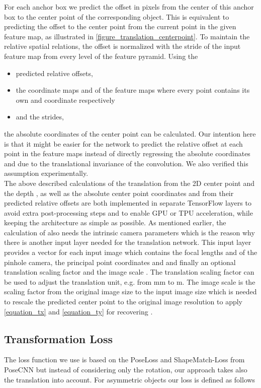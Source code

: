 \documentclass[twocolumn, 10pt, letterpaper]{article}
\begin{document}
For each anchor box we predict the offset in pixels from the center of this anchor box to the center point  of the corresponding object. This is equivalent to predicting the offset to the center point from the current point in the given feature map, as illustrated in \autoref{figure_translation_centerpoint}. To maintain the relative spatial relations, the offset is normalized with the stride of the input feature map from every level of the feature pyramid. Using the 
\begin{itemize}
	\item predicted relative offsets,
	\item the coordinate maps  and  of the feature maps where every point contains its own  and  coordinate respectively
	\item and the strides,
\end{itemize}
the absolute coordinates of the center point  can be calculated. Our intention here is that it might be easier for the network to predict the relative offset at each point in the feature maps instead of directly regressing the absolute coordinates  and  due to the translational invariance of the convolution. We also verified this assumption experimentally.\\

The above described calculations of the translation  from the 2D center point  and the depth , as well as the absolute center point coordinates  and  from their predicted relative offsets are both implemented in separate TensorFlow\cite{TensorFlow} layers to avoid extra post-processing steps and to enable GPU or TPU acceleration, while keeping the architecture as simple as possible. As mentioned earlier, the calculation of  also needs the intrinsic camera parameters which is the reason why there is another input layer needed for the translation network. This input layer provides a vector  for each input image which contains the focal lengths  and  of the pinhole camera, the principal point coordinates  and  and finally an optional translation scaling factor  and the image scale . The translation scaling factor  can be used to adjust the translation unit, e.g. from mm to m. The image scale  is the scaling factor from the original image size to the input image size which is needed to rescale the predicted center point  to the original image resolution to apply \autoref{equation_tx} and \autoref{equation_ty} for recovering .

\subsection{Transformation Loss}
\label{subsection_transformation_loss}
The loss function we use is based on the PoseLoss and ShapeMatch-Loss from PoseCNN\cite{PoseCNN} but instead of considering only the rotation, our approach takes also the translation into account. For asymmetric objects our loss  is defined as follows
\end{document}
